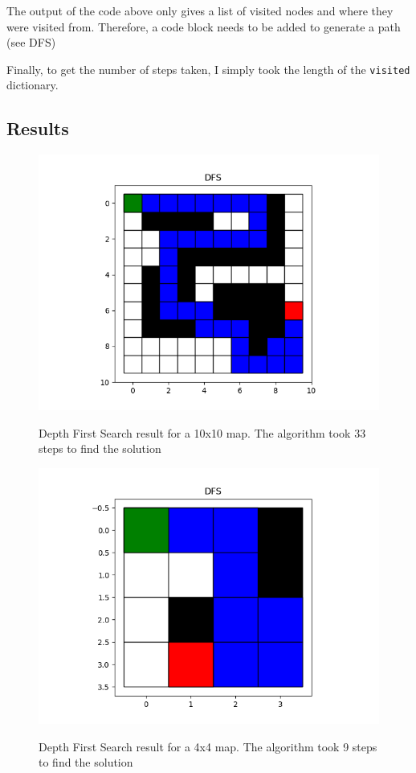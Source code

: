 \documentclass[journal]{IEEEtran}
\begin{document}
    The output of the code above only gives a list of visited nodes and where they were visited from. Therefore, a code block needs to be added to generate a path (see DFS)

    Finally, to get the number of steps taken, I simply took the length of the \lstinline{visited} dictionary.

    \subsection{Results}

    \begin{figure}[ht]
        \includegraphics[width=\linewidth]{figures/DFS_LargeMap_Path.png}
        \label{fig:Dijkstra_Weights_Example}
        \caption{Depth First Search result for a 10x10 map. The algorithm took 33 steps to find the solution}
    \end{figure} 

    \begin{figure}[ht]
        \includegraphics[width=\linewidth]{figures/DFS_SmallMap_Path.png}
        \label{fig:Dijkstra_Weights_Example}
        \caption{Depth First Search result for a 4x4 map. The algorithm took 9 steps to find the solution}
    \end{figure} 
    
\end{document}
